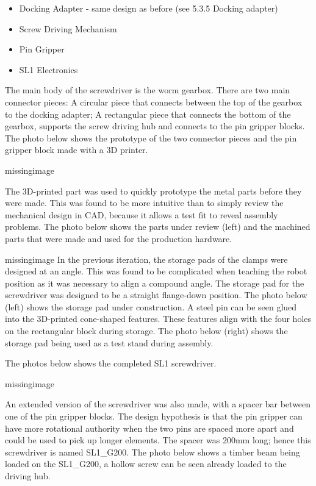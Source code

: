 \begin{itemize}
    \item Docking Adapter - same design as before (see 5.3.5 Docking adapter)
    \item Screw Driving Mechanism 
    \item Pin Gripper 
    \item SL1 Electronics 
\end{itemize}

The main body of the screwdriver is the worm gearbox. There are two main connector pieces: A circular piece that connects between the top of the gearbox to the docking adapter; A rectangular piece that connects the bottom of the gearbox, supports the screw driving hub and connects to the pin gripper blocks. The photo below shows the prototype of the two connector pieces and the pin gripper block made with a 3D printer.

missingimage

The 3D-printed part was used to quickly prototype the metal parts before they were made. This was found to be more intuitive than to simply review the mechanical design in CAD, because it allows a test fit to reveal assembly problems. The photo below shows the parts under review (left) and the machined parts that were made and used for the production hardware.

missingimage
In the previous iteration, the storage pads of the clamps were designed at an angle. This was found to be complicated when teaching the robot position as it was necessary to align a compound angle. The storage pad for the screwdriver was designed to be a straight flange-down position. The photo below (left) shows the storage pad under construction. A steel pin can be seen glued into the 3D-printed cone-shaped features. These features align with the four holes on the rectangular block during storage. The photo below (right) shows the storage pad being used as a test stand during assembly. 

The photos below shows the completed SL1 screwdriver. 

missingimage

An extended version of the screwdriver was also made, with a spacer bar between one of the pin gripper blocks. The design hypothesis is that the pin gripper can have more rotational authority when the two pins are spaced more apart and could be used to pick up longer elements. The spacer was 200mm long; hence this screwdriver is named SL1\_G200. The photo below shows a timber beam being loaded on the SL1\_G200, a hollow screw can be seen already loaded to the driving hub.

